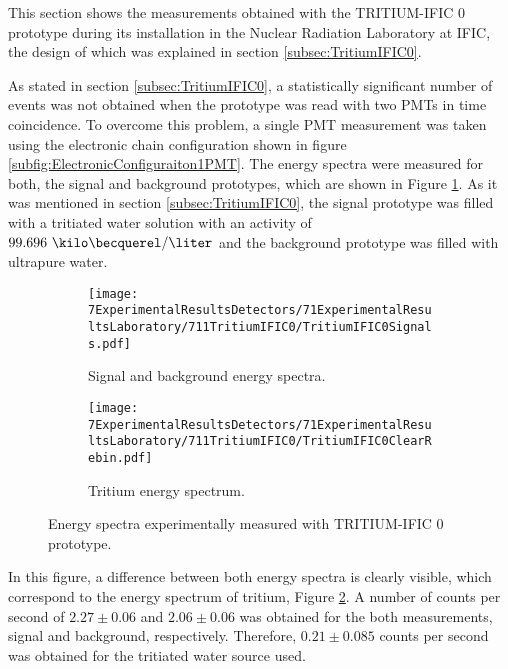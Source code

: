 This section shows the measurements obtained with the TRITIUM-IFIC 0 prototype during its installation in the Nuclear Radiation Laboratory at IFIC, the design of which was explained in section \ref{subsec:TritiumIFIC0}.

As stated in section \ref{subsec:TritiumIFIC0}, a statistically significant number of events was not obtained when the prototype was read with two PMTs in time coincidence. To overcome this problem, a single PMT measurement was taken using the electronic chain configuration shown in figure \ref{subfig:ElectronicConfiguraiton1PMT}. The energy spectra were measured for both, the signal and background prototypes, which are shown in Figure \ref{subfig:SignalBackgroundEnergySpectraTritiumIFIC0}. As it was mentioned in section \ref{subsec:TritiumIFIC0}, the signal prototype was filled with a tritiated water solution with an activity of $99.696~\kilo\becquerel/\liter$ and the background prototype was filled with ultrapure water.

\begin{figure}
\centering
    \begin{subfigure}[b]{0.75\textwidth}
    \centering
    \texttt{[image: 7ExperimentalResultsDetectors/71ExperimentalResultsLaboratory/711TritiumIFIC0/TritiumIFIC0Signals.pdf]}  
    \caption{Signal and background energy spectra.\label{subfig:SignalBackgroundEnergySpectraTritiumIFIC0}}
    \end{subfigure}
    \hfill
    \begin{subfigure}[b]{0.75\textwidth}
    \centering
    \texttt{[image: 7ExperimentalResultsDetectors/71ExperimentalResultsLaboratory/711TritiumIFIC0/TritiumIFIC0ClearRebin.pdf]}  
    \caption{Tritium energy spectrum.\label{subfig:TritiumEnergySpectraTritiumIFIC0}}
    \end{subfigure}
 \caption{Energy spectra experimentally measured with TRITIUM-IFIC 0 prototype.}
 \label{fig:EnergySpectraTRITIUMIFIC0}
\end{figure}


In this figure, a difference between both energy spectra is clearly visible, which correspond to the energy spectrum of tritium, Figure \ref{subfig:TritiumEnergySpectraTritiumIFIC0}. A number of counts per second of $2.27 \pm 0.06$ and $2.06 \pm 0.06$ was obtained for the both measurements, signal and background, respectively. Therefore, $0.21 \pm 0.085$ counts per second was obtained for the tritiated water source used.


